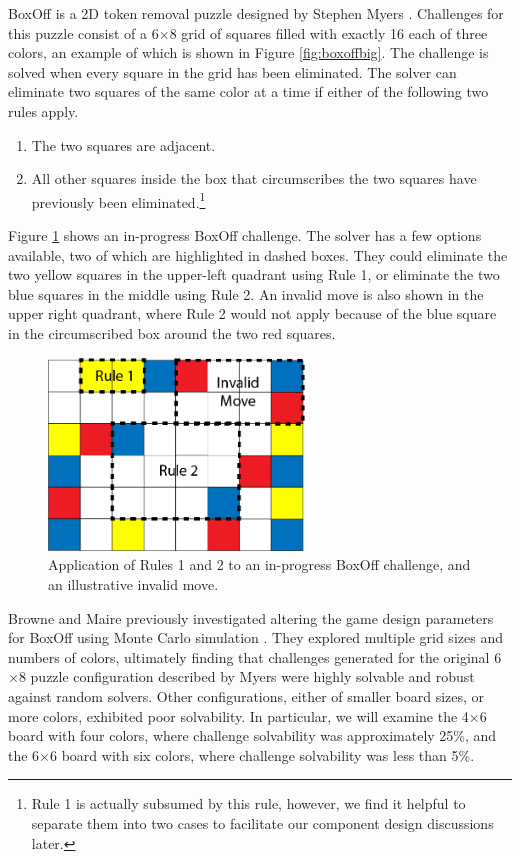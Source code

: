 \documentclass[journal]{IEEEtran}
\begin{document}
BoxOff is a 2D token removal puzzle designed by Stephen Myers  \cite{BoxOffGAMES}. Challenges for this puzzle consist of a 6$\times$8 grid of squares filled with exactly 16 each of three colors, an example of which is shown in 
Figure \ref{fig:boxoffbig}. The challenge is solved when every square in the grid has been eliminated.  The solver can eliminate two squares of the same color at a time if either of the following two rules apply.
\begin{enumerate}
    \item The two squares are adjacent.
    \item All other squares inside the box that circumscribes the two squares have previously been eliminated.\footnote{Rule 1 is actually subsumed by this rule, however, we find it helpful to separate them into two cases to facilitate our component design discussions later.}
\end{enumerate}

Figure \ref{fig:boxoffrules} shows an in-progress BoxOff challenge. The solver has a few options available, two of which are highlighted in dashed boxes. They could eliminate the two yellow squares in the upper-left quadrant using Rule 1, or eliminate the two blue squares in the middle using Rule 2. An invalid move is also shown in the upper right quadrant, where Rule 2 would not apply because of the blue square in the circumscribed box around the two red squares.

\begin{figure}[t]
\centering
\includegraphics[width=6.8cm]{boxoffrules.png}
\caption{Application of Rules 1 and 2 to an in-progress BoxOff challenge, and an illustrative invalid move.}
\label{fig:boxoffrules}
\end{figure}


Browne and Maire previously investigated altering the game design parameters for BoxOff using Monte Carlo simulation \cite{MCPUZZLE}. They explored multiple grid sizes and numbers of colors, ultimately finding that challenges generated for the original 6$\times$8 puzzle configuration described by Myers were highly solvable and robust against random solvers. Other configurations, either of smaller board sizes, or more colors, exhibited poor solvability. In particular, we will examine the 4$\times$6 board with four colors, where challenge solvability was approximately 25\%, and the 6$\times$6 board with six colors, where challenge solvability was less than 5\%.
\end{document}

